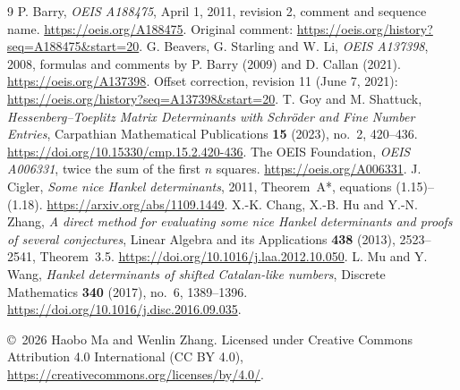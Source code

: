\documentclass[11pt]{article}
\begin{document}
\begin{thebibliography}{9}
\small
{} P. Barry, \emph{OEIS A188475}, April 1, 2011,
revision 2, comment and sequence name.
\url{https://oeis.org/A188475}.
Original comment: \url{https://oeis.org/history?seq=A188475&start=20}.
 G. Beavers, G. Starling and W. Li,
\emph{OEIS A137398}, 2008, formulas and comments by P. Barry (2009)
and D. Callan (2021). \url{https://oeis.org/A137398}.
Offset correction, revision 11 (June 7, 2021):
\url{https://oeis.org/history?seq=A137398&start=20}.
 T. Goy and M. Shattuck,
\emph{Hessenberg--Toeplitz Matrix Determinants with Schr\"oder and Fine
Number Entries}, Carpathian Mathematical Publications
\textbf{15} (2023), no.~2, 420--436.
\url{https://doi.org/10.15330/cmp.15.2.420-436}.
 The OEIS Foundation,
\emph{OEIS A006331}, twice the sum of the first $n$ squares.
\url{https://oeis.org/A006331}.
 J. Cigler, \emph{Some nice Hankel determinants},
2011, Theorem~A*, equations (1.15)--(1.18).
\url{https://arxiv.org/abs/1109.1449}.
 X.-K. Chang, X.-B. Hu and Y.-N. Zhang,
\emph{A direct method for evaluating some nice Hankel determinants and
proofs of several conjectures}, Linear Algebra and its Applications
\textbf{438} (2013), 2523--2541, Theorem~3.5.
\url{https://doi.org/10.1016/j.laa.2012.10.050}.
 L. Mu and Y. Wang,
\emph{Hankel determinants of shifted Catalan-like numbers},
Discrete Mathematics \textbf{340} (2017), no.~6, 1389--1396.
\url{https://doi.org/10.1016/j.disc.2016.09.035}.
\end{thebibliography}
\medskip
\noindent\small\copyright\ 2026 Haobo Ma and Wenlin Zhang.
Licensed under Creative Commons Attribution 4.0 International (CC BY 4.0),
\url{https://creativecommons.org/licenses/by/4.0/}.
\end{document}
